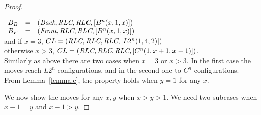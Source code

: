 \begin{proof}
\begin{itemize}[parsep=0cm, itemsep=0cm, topsep=0cm]
$\begin{array}{l c l}
	B_B & = &(\textit{Back}, \textit{RLC}, \textit{RLC}, [B^n(x, 1, x)])\\
	B_F & = &(\textit{Front}, \textit{RLC}, \textit{RLC}, [B^n(x, 1, x)])
\end{array}$\\
and if $x=3$, $CL =(\textit{RLC}, \textit{RLC}, \textit{RLC}, [L2^n(1, 4, 2)])$\\
otherwise $x>3$, $CL =(\textit{RLC}, \textit{RLC}, \textit{RLC}, [C^n(1, x+1, x-1)])$.\\
      Similarly as above there are two cases when $x=3$ or $x>3$.
      In the first case the moves reach $L2^n$ configurations, and in the
      second one to $C^n$ configurations.
      From Lemma~\ref{lemma:c}, the property holds when $y=1$ for any $x$.
\end{itemize}
	
\noindent
We now show the moves for any $x, y$ when $x>y>1$.  We need two
subcases when $x-1 = y$ and $x-1>y$.


\end{proof}
